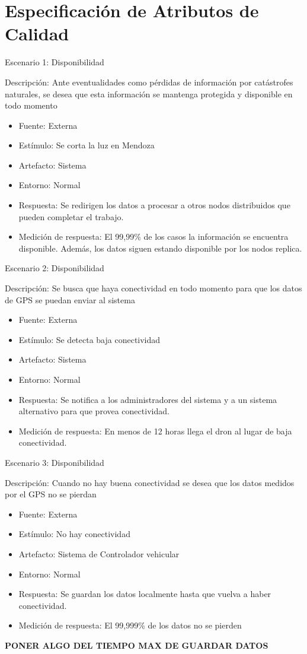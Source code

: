 \section{Especificación de Atributos de Calidad}

Escenario 1: Disponibilidad


Descripción: Ante eventualidades como pérdidas de información por catástrofes naturales, se desea que esta información se mantenga protegida y disponible en todo momento
\begin{itemize}
\item Fuente: Externa
\item Estímulo: Se corta la luz en Mendoza
\item Artefacto: Sistema
\item Entorno: Normal
\item Respuesta: Se redirigen los datos a procesar a otros nodos distribuidos que pueden completar el trabajo.  
\item Medición de respuesta: El 99,99\% de los casos la información se encuentra disponible. Además, los datos siguen estando disponible por los nodos replica.

\end{itemize} 

Escenario 2: Disponibilidad


Descripción: Se busca que haya conectividad en todo momento para que los datos de GPS se puedan enviar al sistema
\begin{itemize}
\item Fuente: Externa
\item Estímulo: Se detecta baja conectividad
\item Artefacto: Sistema
\item Entorno: Normal
\item Respuesta: Se notifica a los administradores del sistema y a un sistema alternativo para que provea conectividad.
\item Medición de respuesta: En menos de 12 horas llega el dron al lugar de baja conectividad.
\end{itemize} 

Escenario 3: Disponibilidad


Descripción: Cuando no hay buena conectividad se desea que los datos medidos por el GPS no se pierdan
\begin{itemize}
\item Fuente: Externa
\item Estímulo: No hay conectividad
\item Artefacto: Sistema de Controlador vehicular
\item Entorno: Normal
\item Respuesta: Se guardan los datos localmente hasta que vuelva a haber conectividad. 
\item Medición de respuesta: El 99,999\% de los datos no se pierden
\end{itemize} 
\textbf{PONER ALGO DEL TIEMPO MAX DE GUARDAR DATOS}


